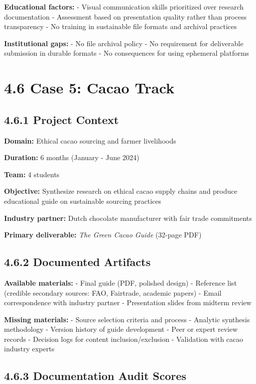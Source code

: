 \documentclass[
  oneside,
  open=any]{scrbook}
\begin{document}
\textbf{Educational factors:} - Visual communication skills prioritized
over research documentation - Assessment based on presentation quality
rather than process transparency - No training in sustainable file
formats and archival practices

\textbf{Institutional gaps:} - No file archival policy - No requirement
for deliverable submission in durable formats - No consequences for
using ephemeral platforms

\section{4.6 Case 5: Cacao Track}\label{case-5-cacao-track}

\subsection{4.6.1 Project Context}\label{project-context-4}

\textbf{Domain:} Ethical cacao sourcing and farmer livelihoods

\textbf{Duration:} 6 months (January - June 2024)

\textbf{Team:} 4 students

\textbf{Objective:} Synthesize research on ethical cacao supply chains
and produce educational guide on sustainable sourcing practices

\textbf{Industry partner:} Dutch chocolate manufacturer with fair trade
commitments

\textbf{Primary deliverable:} \emph{The Green Cacao Guide} (32-page PDF)

\subsection{4.6.2 Documented Artifacts}\label{documented-artifacts-4}

\textbf{Available materials:} - Final guide (PDF, polished design) -
Reference list (credible secondary sources: FAO, Fairtrade, academic
papers) - Email correspondence with industry partner - Presentation
slides from midterm review

\textbf{Missing materials:} - Source selection criteria and process -
Analytic synthesis methodology - Version history of guide development -
Peer or expert review records - Decision logs for content
inclusion/exclusion - Validation with cacao industry experts

\subsection{4.6.3 Documentation Audit
Scores}\label{documentation-audit-scores-4}
\end{document}
